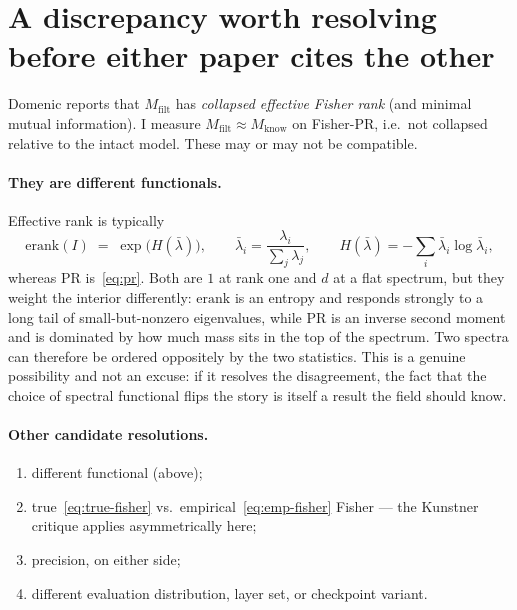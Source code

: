 \documentclass[11pt]{article}
\begin{document}
\section{A discrepancy worth resolving before either paper cites the other}
\label{sec:discrepancy}

Domenic reports that $M_{\mathrm{filt}}$ has \emph{collapsed effective Fisher
rank} (and minimal mutual information). I measure
$M_{\mathrm{filt}} \approx M_{\mathrm{know}}$ on Fisher-PR, i.e.\ not collapsed
relative to the intact model. These may or may not be compatible.

\paragraph{They are different functionals.} Effective rank is typically
\begin{equation}
  \mathrm{erank}(I) \;=\; \exp\!\big(H(\bar{\lambda})\big), \qquad
  \bar{\lambda}_i = \frac{\lambda_i}{\sum_j \lambda_j}, \qquad
  H(\bar\lambda) = -\sum_i \bar\lambda_i \log \bar\lambda_i,
\end{equation}
whereas $\mathrm{PR}$ is~\eqref{eq:pr}. Both are $1$ at rank one and $d$ at a
flat spectrum, but they weight the interior differently: $\mathrm{erank}$ is an
entropy and responds strongly to a long tail of small-but-nonzero eigenvalues,
while $\mathrm{PR}$ is an inverse second moment and is dominated by how much
mass sits in the top of the spectrum. Two spectra can therefore be ordered
oppositely by the two statistics. This is a genuine possibility and not an
excuse: if it resolves the disagreement, the fact that the choice of spectral
functional flips the story is itself a result the field should know.

\paragraph{Other candidate resolutions.}
\begin{enumerate}[label=(\alph*),leftmargin=*]
  \item different functional (above);
  \item true~\eqref{eq:true-fisher} vs.\ empirical~\eqref{eq:emp-fisher}
        Fisher --- the Kunstner critique applies asymmetrically here;
  \item precision, on either side;
  \item different evaluation distribution, layer set, or checkpoint variant.
\end{enumerate}
\end{document}
